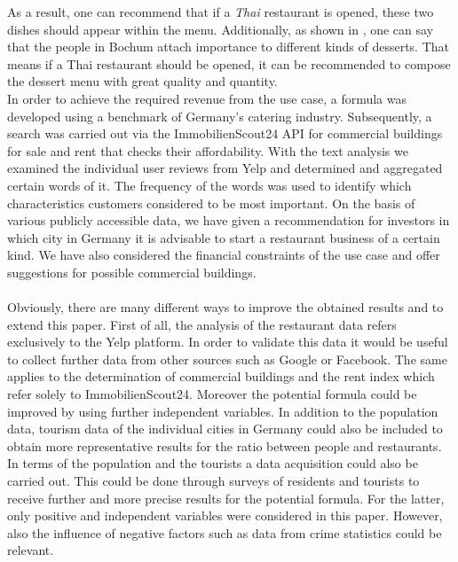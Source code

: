 As a result, one can recommend that if a \textit{Thai} restaurant is opened, these two dishes should appear within the menu. Additionally, as shown in , one can say that the people in Bochum attach importance to different kinds of desserts. That means if a Thai restaurant should be opened, it can be recommended to compose the dessert menu with great quality and quantity.\\
In order to achieve the required revenue from the use case, a formula was developed using a benchmark of Germany's catering industry. Subsequently, a search was carried out via the ImmobilienScout24 \ac{API} for commercial buildings for sale and rent that checks their affordability.
With the text analysis we examined the individual user reviews from Yelp and determined and aggregated certain words of it. The frequency of the words was used to identify which characteristics customers considered to be most important.\newline
On the basis of various publicly accessible data, we have given a recommendation for investors in which city in Germany it is advisable to start a restaurant business of a certain kind. We have also considered the financial constraints of the use case and offer suggestions for possible commercial buildings.
\\\\
Obviously, there are many different ways to improve the obtained results and to extend this paper. First of all, the analysis of the restaurant data refers exclusively to the Yelp platform. In order to validate this data it would be useful to collect further data from other sources such as Google or Facebook. The same applies to the determination of commercial buildings and the rent index which refer solely to ImmobilienScout24. \newline
Moreover the potential formula could be improved by using further independent variables. In addition to the population data, tourism data of the individual cities in Germany could also be included to obtain more representative results for the ratio between people and restaurants. In terms of the population and the tourists a data acquisition could also be carried out. This could be done through surveys of residents and tourists to receive further and more precise results for the potential formula. For the latter, only positive and independent variables were considered in this paper. However, also the influence of negative factors such as data from crime statistics could be relevant. \newline

